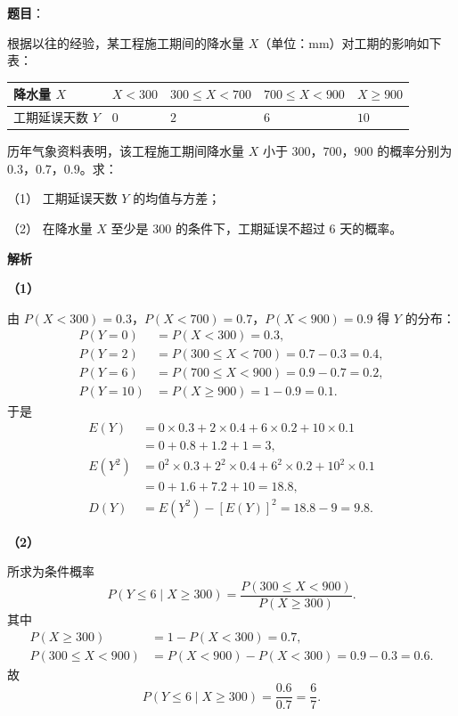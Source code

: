 \begin{answer}

\textbf{题目}：

根据以往的经验，某工程施工期间的降水量 $X$（单位：mm）对工期的影响如下表：

\begin{center}
\begin{tabular}{lllll}
\toprule
降水量 $X$ & $X<300$ & $300\leqslant X<700$ & $700\leqslant X<900$ & $X\geqslant900$ \\
\midrule
工期延误天数 $Y$ & $0$ & $2$ & $6$ & $10$ \\
\bottomrule
\end{tabular}
\end{center}

历年气象资料表明，该工程施工期间降水量 $X$ 小于 $300$，$700$，$900$ 的概率分别为 $0.3$，$0.7$，$0.9$。求：

（1） 工期延误天数 $Y$ 的均值与方差；

（2） 在降水量 $X$ 至少是 $300$ 的条件下，工期延误不超过 $6$ 天的概率。

\textbf{解析}

\textbf{（1）}

由 $P(X<300)=0.3$，$P(X<700)=0.7$，$P(X<900)=0.9$ 得 $Y$ 的分布：
\nopagebreak[4]
\[\begin{aligned}
P(Y=0)&=P(X<300)=0.3,\\
P(Y=2)&=P(300\leqslant X<700)=0.7-0.3=0.4,\\
P(Y=6)&=P(700\leqslant X<900)=0.9-0.7=0.2,\\
P(Y=10)&=P(X\geqslant900)=1-0.9=0.1.
\end{aligned}\]
于是
\nopagebreak[4]
\[\begin{aligned}
E(Y)&=0\times0.3+2\times0.4+6\times0.2+10\times0.1\\
&=0+0.8+1.2+1=3,\\
E(Y^2)&=0^2\times0.3+2^2\times0.4+6^2\times0.2+10^2\times0.1\\
&=0+1.6+7.2+10=18.8,\\
D(Y)&=E(Y^2)-\left[E(Y)\right]^2=18.8-9=9.8.
\end{aligned}\]

\textbf{（2）}

所求为条件概率
\nopagebreak[4]
\[P(Y\leqslant6\mid X\geqslant300)=\frac{P(300\leqslant X<900)}{P(X\geqslant300)}.\]
其中
\nopagebreak[4]
\[\begin{aligned}
P(X\geqslant300)&=1-P(X<300)=0.7,\\
P(300\leqslant X<900)&=P(X<900)-P(X<300)=0.9-0.3=0.6.
\end{aligned}\]
故
\nopagebreak[4]
\[P(Y\leqslant6\mid X\geqslant300)=\frac{0.6}{0.7}=\frac67.\]



\end{answer}
